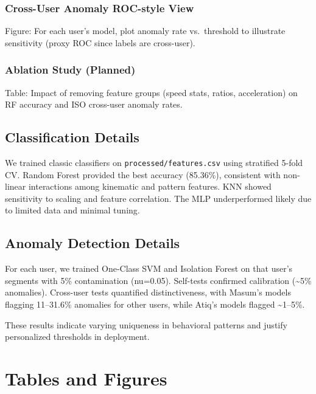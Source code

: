 \documentclass[
  12pt,
  a4paper,
]{report}
\begin{document}
\subsection{Cross-User Anomaly ROC-style
View}\label{cross-user-anomaly-roc-style-view}

Figure: For each user's model, plot anomaly rate vs.~threshold to
illustrate sensitivity (proxy ROC since labels are cross-user).

\subsection{Ablation Study (Planned)}\label{ablation-study-planned}

Table: Impact of removing feature groups (speed stats, ratios,
acceleration) on RF accuracy and ISO cross-user anomaly rates.

\section{Classification Details}\label{classification-details}

We trained classic classifiers on \texttt{processed/features.csv} using
stratified 5-fold CV. Random Forest provided the best accuracy
(85.36\%), consistent with non-linear interactions among kinematic and
pattern features. KNN showed sensitivity to scaling and feature
correlation. The MLP underperformed likely due to limited data and
minimal tuning.

\section{Anomaly Detection Details}\label{anomaly-detection-details}

For each user, we trained One-Class SVM and Isolation Forest on that
user's segments with 5\% contamination (nu=0.05). Self-tests confirmed
calibration (\textasciitilde5\% anomalies). Cross-user tests quantified
distinctiveness, with Masum's models flagging 11--31.6\% anomalies for
other users, while Atiq's models flagged \textasciitilde1--5\%.

These results indicate varying uniqueness in behavioral patterns and
justify personalized thresholds in deployment.

\chapter{Tables and Figures}\label{tables-and-figures}
\end{document}
